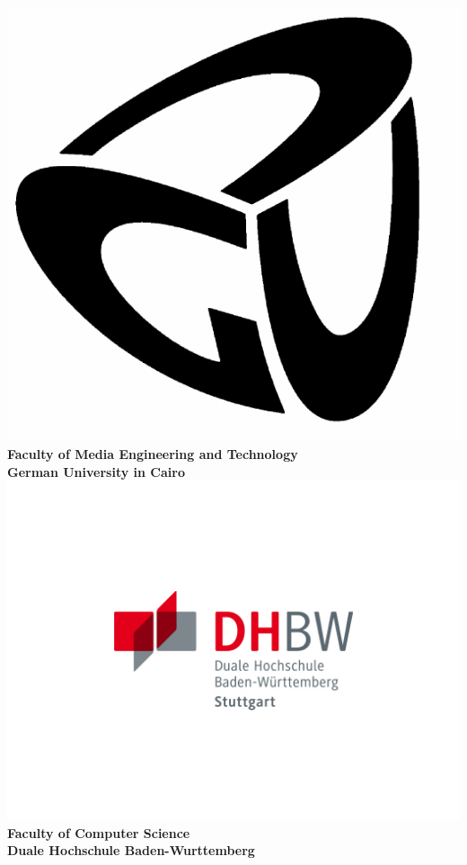 \documentclass[11pt]{report}
\begin{document}
\begin{center}
\includegraphics [scale=0.25] {GUClogo.pdf}
\\
\textbf{Faculty of Media Engineering and Technology}
\\
\textbf{German University in Cairo}
\\
\includegraphics [scale=0.75] {DHBWlogo.png}
\\
\textbf{Faculty of Computer Science}
\\
\textbf{Duale Hochschule Baden-Wurttemberg}

\end{center}
\end{document}
